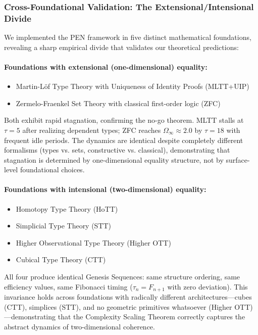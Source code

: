 \documentclass[11pt]{article}
\theoremstyle{definition}
\theoremstyle{remark}
\begin{document}
\subsubsection*{Cross-Foundational Validation: The Extensional/Intensional Divide}

We implemented the PEN framework in five distinct mathematical foundations, revealing a sharp
empirical divide that validates our theoretical predictions:

\paragraph{Foundations with extensional (one-dimensional) equality:}
\begin{itemize}
\item Martin-L\"of Type Theory with Uniqueness of Identity Proofs (MLTT+UIP)
\item Zermelo-Fraenkel Set Theory with classical first-order logic (ZFC)
\end{itemize}

Both exhibit rapid stagnation, confirming the no-go theorem. MLTT stalls at $\tau = 5$ after realizing dependent types; ZFC reaches $\Omega_\infty \approx 2.0$ by $\tau = 18$ with frequent idle periods. The
dynamics are identical despite completely different formalisms (types vs. sets, constructive vs.
classical), demonstrating that stagnation is determined by one-dimensional equality structure, not
by surface-level foundational choices.

\paragraph{Foundations with intensional (two-dimensional) equality:}
\begin{itemize}
\item Homotopy Type Theory (HoTT)
\item Simplicial Type Theory (STT)
\item Higher Observational Type Theory (Higher OTT)
\item Cubical Type Theory (CTT)
\end{itemize}

All four produce identical Genesis Sequences: same structure ordering, same efficiency values,
same Fibonacci timing ($\tau_n = F_{n+1}$ with zero deviation). This invariance holds across foundations with radically different architectures---cubes (CTT), simplices (STT), and no geometric
primitives whatsoever (Higher OTT)---demonstrating that the Complexity Scaling Theorem correctly captures the abstract dynamics of two-dimensional coherence.
\end{document}
